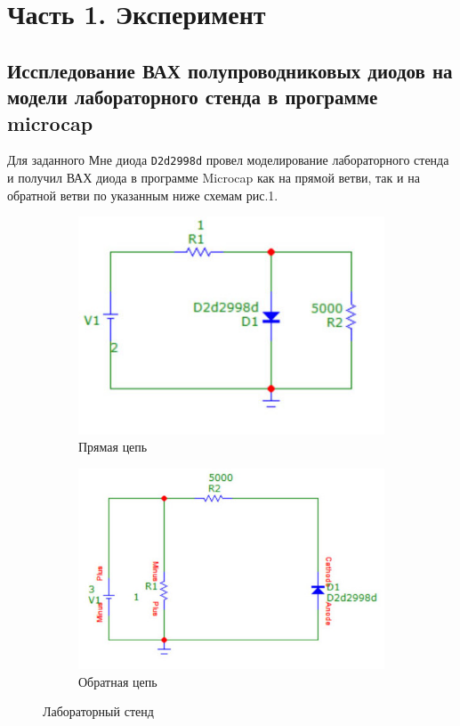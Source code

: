 \section{Часть 1. Эксперимент}

\subsection{Исспледование ВАХ полупроводниковых диодов на модели лабораторного стенда в программе microcap}

	\noindent Для заданного Мне диода \texttt{D2d2998d} провел моделирование лабораторного стенда и получил ВАХ диода в программе Microcap как на прямой ветви, так и на
	обратной ветви по указанным ниже схемам рис.1.
	\begin{figure}[ht]
		\centering
		\begin{subfigure}{0.45\textwidth}
			\centering
			\includegraphics[width=\textwidth]{img/01_main_mcp.jpg}
			\caption{Прямая цепь}
			\label{fig:subfig_a}
		\end{subfigure}
		\hfill
		\begin{subfigure}{0.45\textwidth}
			\centering
			\includegraphics[width=\textwidth]{img/01_back_mcp.jpg}
			\caption{Обратная цепь}
			\label{fig:subfig_b}
		\end{subfigure}
		\captionsetup{font=footnotesize}
		\caption{Лабораторный стенд}
	\end{figure}
	
